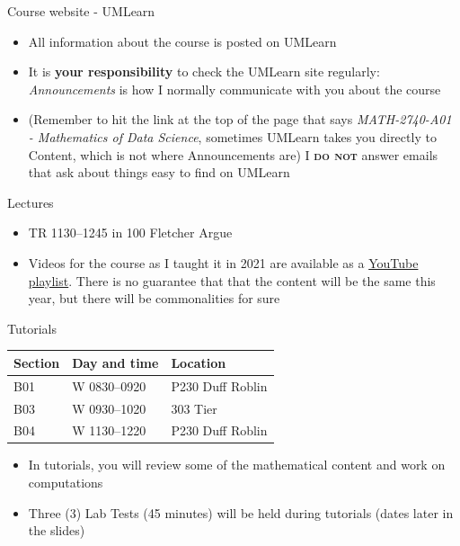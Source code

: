 \documentclass[aspectratio=169]{beamer}\usepackage[]{graphicx}\usepackage[]{xcolor}
\begin{document}
\begin{frame}{Course website - UMLearn}
\begin{itemize}
\item All information about the course is posted on UMLearn
\vfill
\item It is \textbf{your responsibility} to check the UMLearn site regularly: \textit{Announcements} is how I normally communicate with you about the course
\vfill
\item (Remember to hit the link at the top of the page that says \textit{MATH-2740-A01 - Mathematics of Data Science}, sometimes UMLearn takes you directly to Content, which is not where Announcements are)
\vfill {} I \textsc{\textbf{do not}} answer emails that ask about things easy to find on UMLearn
\end{itemize}
\end{frame}

\begin{frame}{Lectures}
\begin{itemize}
\item TR 1130--1245 in 100 Fletcher Argue
\vfill
\item Videos for the course as I taught it in 2021 are available as a \href{https://www.youtube.com/playlist?list=PLfRaznSpWo2vQAn1jVyueTuAiryDaxkH3}{YouTube playlist}. There is no guarantee that that the content will be the same this year, but there will be commonalities for sure
\end{itemize}
\end{frame}

\begin{frame}{Tutorials}
\begin{center}
\begin{tabular}{lll}
\toprule
Section & Day and time & Location \\
\midrule
B01 & W 0830--0920 & P230 Duff Roblin \\
B03 & W 0930--1020 & 303 Tier \\
B04 & W 1130--1220 & P230 Duff Roblin \\
\bottomrule
\end{tabular}
\end{center}
\vfill
\begin{itemize}
\item In tutorials, you will review some of the mathematical content and work on computations
\vfill
\item Three (3) Lab Tests (45 minutes) will be held during tutorials (dates later in the slides)
\end{itemize}
\end{frame}
\end{document}
